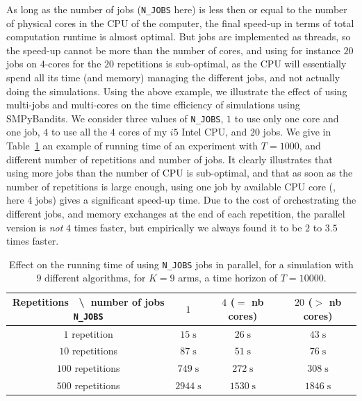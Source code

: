 As long as the number of jobs (\texttt{N\_JOBS} here) is less then or equal to the number of physical cores in the CPU of the computer, the final speed-up in terms of total computation runtime is almost optimal.
But jobs are implemented as threads, so the speed-up cannot be more than the number of cores, and using for instance $20$ jobs on $4$-cores for the $20$ repetitions is sub-optimal, as the CPU will essentially spend all its time (and memory) managing the different jobs, and not actually doing the simulations.
Using the above example, we illustrate the effect of using multi-jobs and multi-cores on the time efficiency of simulations using SMPyBandits. We consider three values of \texttt{N\_JOBS}, $1$ to use only one core and one job, $4$ to use all the $4$ cores of my $i5$ Intel CPU, and $20$ jobs.
We give in Table~\ref{table:3:speedUpTimeParallelComputations} an example of running time of an experiment with $T=1000$, and different number of repetitions and number of jobs.
It clearly illustrates that using more jobs than the number of CPU is sub-optimal, and that as soon as the number of repetitions is large enough, using one job by available CPU core (\ie, here $4$ jobs) gives a significant speed-up time.
Due to the cost of orchestrating the different jobs, and memory exchanges at the end of each repetition, the parallel version is \emph{not} $4$ times faster, but empirically we always found it to be $2$ to $3.5$ times faster.


\begin{table}[ht]
    \centering
    \begin{tabular}{c|ccc}
    \textbf{Repetitions} $\;$ \textbackslash $\;$ number of jobs \texttt{N\_JOBS} & $1$ & $4$ ($=$ nb cores) & $20$ ($>$ nb cores) \\
        \hline
        $1$ repetition    & $15 \;\text{s}$ & $26 \;\text{s}$ & $43 \;\text{s}$ \\
        $10$ repetitions  & $87 \;\text{s}$ & $51 \;\text{s}$ & $76 \;\text{s}$ \\
        $100$ repetitions & $749 \;\text{s}$ & $272 \;\text{s}$ & $308 \;\text{s}$ \\
        $500$ repetitions & $2944 \;\text{s}$ & $1530 \;\text{s}$ & $1846 \;\text{s}$ \\
        \hline
    \end{tabular}
    \caption{Effect on the running time of using \texttt{N\_JOBS} jobs in parallel, for a simulation with $9$ different algorithms, for $K=9$ arms, a time horizon of $T=10000$.}
    \label{table:3:speedUpTimeParallelComputations}
\end{table}


